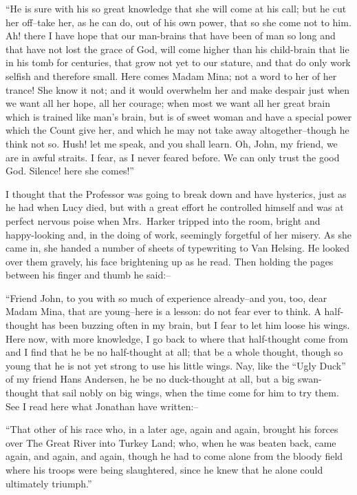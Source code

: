\documentclass[12pt,openright]{book}
\begin{document}
“He is sure with his so great knowledge that she will come at his call; but he cut her off–take her, as he can do, out of his own power, that so she come not to him. Ah! there I have hope that our man-brains that have been of man so long and that have not lost the grace of God, will come higher than his child-brain that lie in his tomb for centuries, that grow not yet to our stature, and that do only work selfish and therefore small. Here comes Madam Mina; not a word to her of her trance! She know it not; and it would overwhelm her and make despair just when we want all her hope, all her courage; when most we want all her great brain which is trained like man’s brain, but is of sweet woman and have a special power which the Count give her, and which he may not take away altogether–though he think not so. Hush! let me speak, and you shall learn. Oh, John, my friend, we are in awful straits. I fear, as I never feared before. We can only trust the good God. Silence! here she comes!”

I thought that the Professor was going to break down and have hysterics, just as he had when Lucy died, but with a great effort he controlled himself and was at perfect nervous poise when Mrs. Harker tripped into the room, bright and happy-looking and, in the doing of work, seemingly forgetful of her misery. As she came in, she handed a number of sheets of typewriting to Van Helsing. He looked over them gravely, his face brightening up as he read. Then holding the pages between his finger and thumb he said:–

“Friend John, to you with so much of experience already–and you, too, dear Madam Mina, that are young–here is a lesson: do not fear ever to think. A half-thought has been buzzing often in my brain, but I fear to let him loose his wings. Here now, with more knowledge, I go back to where that half-thought come from and I find that he be no half-thought at all; that be a whole thought, though so young that he is not yet strong to use his little wings. Nay, like the “Ugly Duck” of my friend Hans Andersen, he be no duck-thought at all, but a big swan-thought that sail nobly on big wings, when the time come for him to try them. See I read here what Jonathan have written:–

“That other of his race who, in a later age, again and again, brought his forces over The Great River into Turkey Land; who, when he was beaten back, came again, and again, and again, though he had to come alone from the bloody field where his troops were being slaughtered, since he knew that he alone could ultimately triumph.”
\end{document}
